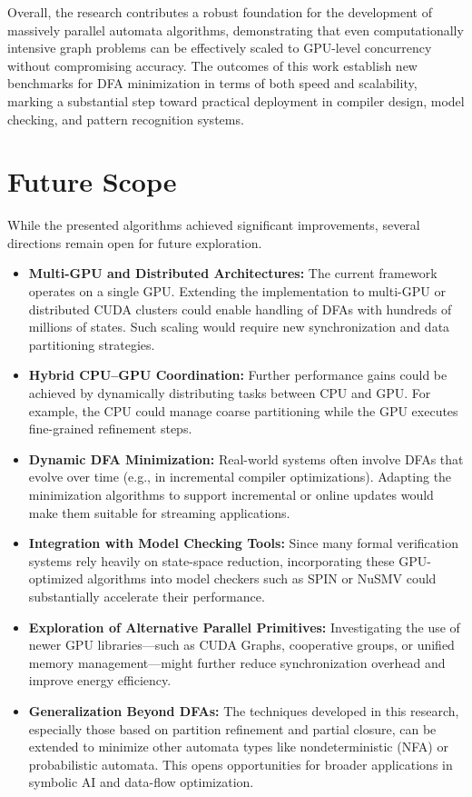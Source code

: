 Overall, the research contributes a robust foundation for the development of massively parallel automata algorithms, demonstrating that even computationally intensive graph problems can be effectively scaled to GPU-level concurrency without compromising accuracy. The outcomes of this work establish new benchmarks for DFA minimization in terms of both speed and scalability, marking a substantial step toward practical deployment in compiler design, model checking, and pattern recognition systems.

\section{Future Scope}

While the presented algorithms achieved significant improvements, several directions remain open for future exploration.

\begin{itemize}
  \item \textbf{Multi-GPU and Distributed Architectures:} The current framework operates on a single GPU. Extending the implementation to multi-GPU or distributed CUDA clusters could enable handling of DFAs with hundreds of millions of states. Such scaling would require new synchronization and data partitioning strategies.
  \item \textbf{Hybrid CPU–GPU Coordination:} Further performance gains could be achieved by dynamically distributing tasks between CPU and GPU. For example, the CPU could manage coarse partitioning while the GPU executes fine-grained refinement steps.
  \item \textbf{Dynamic DFA Minimization:} Real-world systems often involve DFAs that evolve over time (e.g., in incremental compiler optimizations). Adapting the minimization algorithms to support incremental or online updates would make them suitable for streaming applications.
  \item \textbf{Integration with Model Checking Tools:} Since many formal verification systems rely heavily on state-space reduction, incorporating these GPU-optimized algorithms into model checkers such as SPIN or NuSMV could substantially accelerate their performance.
  \item \textbf{Exploration of Alternative Parallel Primitives:} Investigating the use of newer GPU libraries—such as CUDA Graphs, cooperative groups, or unified memory management—might further reduce synchronization overhead and improve energy efficiency.
  \item \textbf{Generalization Beyond DFAs:} The techniques developed in this research, especially those based on partition refinement and partial closure, can be extended to minimize other automata types like nondeterministic (NFA) or probabilistic automata. This opens opportunities for broader applications in symbolic AI and data-flow optimization.
\end{itemize}